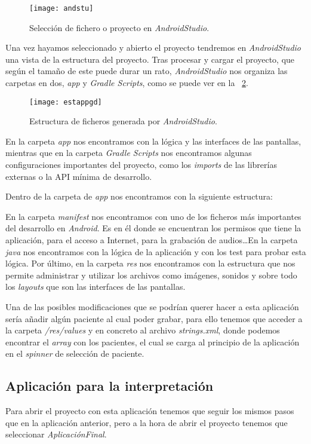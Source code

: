 \begin{figure}
	\centering
	\texttt{[image: andstu]}
	\caption{Selección de fichero o proyecto en \textit{AndroidStudio}.}
	\label{fig:andstu}
\end{figure}

Una vez hayamos seleccionado y abierto el proyecto tendremos en \textit{AndroidStudio} una vista de la estructura del proyecto. Tras procesar y cargar el proyecto, que según el tamaño de este puede durar un rato, \textit{AndroidStudio} nos organiza las carpetas en dos, \textit{app} y \textit{Gradle Scripts}, como se puede ver en la ~\ref{fig:estappgd}.

\begin{figure}
	\centering
	\texttt{[image: estappgd]}
	\caption{Estructura de ficheros generada por \textit{AndroidStudio}.}
	\label{fig:estappgd}
\end{figure}

En la carpeta \textit{app} nos encontramos con la lógica y las interfaces de las pantallas, mientras que en la carpeta \textit{Gradle Scripts} nos encontramos algunas configuraciones importantes del proyecto, como los \textit{imports} de las librerías externas o la API mínima de desarrollo.

Dentro de la carpeta de \textit{app} nos encontramos con la siguiente estructura:

En la carpeta \textit{manifest} nos encontramos con uno de los ficheros más importantes del desarrollo en \textit{Android}. Es en él donde se encuentran los permisos que tiene la aplicación, para el acceso a Internet, para la grabación de audios\ldots En la carpeta \textit{java} nos encontramos con la lógica de la aplicación y con los test para probar esta lógica. Por último, en la carpeta \textit{res} nos encontramos con la estructura que nos permite administrar y utilizar los archivos como imágenes, sonidos y sobre todo los \textit{layouts} que son las interfaces de las pantallas.

Una de las posibles modificaciones que se podrían querer hacer a esta aplicación sería añadir algún paciente al cual poder grabar, para ello tenemos que acceder a la carpeta \textit{/res/values} y en concreto al archivo \textit{strings.xml}, donde podemos encontrar el \textit{array} con los pacientes, el cual se carga al principio de la aplicación en el \textit{spinner} de selección de paciente.

\subsection{Aplicación para la interpretación}
Para abrir el proyecto con esta aplicación tenemos que seguir los mismos pasos que en la aplicación anterior, pero a la hora de abrir el proyecto tenemos que seleccionar \textit{AplicaciónFinal}.

